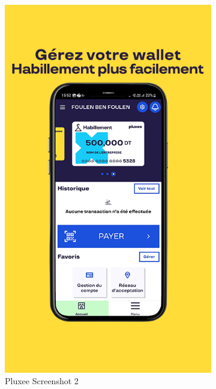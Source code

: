 \begin{figure}[!htb]
\begin{subfigure}[b]{0.32\textwidth}
        \includegraphics[width=\textwidth]{images/pluxee_screenshot_2.png}
        \caption{Pluxee Screenshot 2}
        \label{fig:pluxee_2}
    \end{subfigure}
    \hfill
    \begin{subfigure}[b]{0.32\textwidth}
        \centering

\end{subfigure}
\end{figure}

